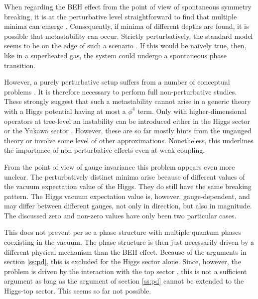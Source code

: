 \documentclass[final,twoside,12pt]{article}
\newcommand*{\1}{1\!\!\!\bot}
\begin{document}
When regarding the BEH effect from the point of view of spontaneous symmetry breaking, it is at the perturbative level straightforward to find that multiple minima can emerge \cite{Sher:1988mj,EliasMiro:2011aa,Alekhin:2012py}. Consequently, if minima of different depths are found, it is possible that metastability can occur. Strictly perturbatively, the standard model seems to be on the edge of such a scenario \cite{Alekhin:2012py,Buttazzo:2013uya,Gabrielli:2013hma,Bednyakov:2015sca,Iacobellis:2016eof}. If this would be naively true, then, like in a superheated gas, the system could undergo a spontaneous phase transition.

However, a purely perturbative setup suffers from a number of conceptual problems \cite{Holland:2003jr,Branchina:2005tu,Branchina:2008pc,Bulava:2012rb,Branchina:2014rva,Eichhorn:2015kea,Borchardt:2016xju}. It is therefore necessary to perform full non-perturbative studies. These strongly suggest that such a metastability cannot arise \cite{Bulava:2012rb,Eichhorn:2015kea,Borchardt:2016xju} in a generic theory with a Higgs potential having at most a $\phi^4$ term. Only with higher-dimensional operators at tree-level an instability can be introduced either in the Higgs sector \cite{Chu:2015nha,Eichhorn:2015kea,Sondenheimer:2017jin} or the Yukawa sector \cite{Gies:2017zwf}. However, these are so far mostly hints from the ungauged theory or involve some level of other approximations. Nonetheless, this underlines the importance of non-perturbative effects even at weak coupling.

From the point of view of gauge invariance this problem appears even more unclear. The perturbatively distinct minima arise because of different values of the vacuum expectation value of the Higgs. They do still have the same breaking pattern. The Higgs vacuum expectation value is, however, gauge-dependent, and may differ between different gauges, not only in direction, but also in magnitude. The discussed zero and non-zero values have only been two particular cases.

This does not prevent per se a phase structure with multiple quantum phases coexisting in the vacuum. The phase structure is then just necessarily driven by a different physical mechanism than the BEH effect. Because of the arguments in section \ref{ss:pd}, this is excluded for the Higgs sector alone. Since, however, the problem is driven by the interaction with the top sector \cite{EliasMiro:2011aa,Alekhin:2012py}, this is not a sufficient argument as long as the argument of section \ref{ss:pd} cannot be extended to the Higgs-top sector. This seems so far not possible.
\end{document}
